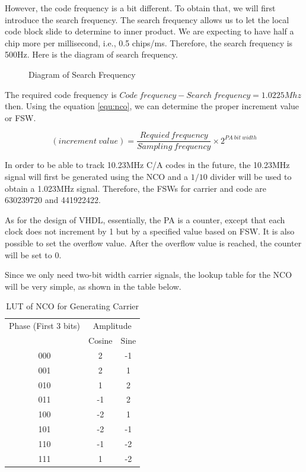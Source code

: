 However, the code frequency is a bit different. To obtain that, we will first introduce the search frequency. The search frequency allows us to let the local code block slide to determine to inner product. We are expecting to have half a chip more per millisecond, i.e., 0.5 chips/ms. Therefore, the search frequency is 500Hz. Here is the diagram of search frequency.

\begin{figure}[!htbp]
    \centering
    
    \caption{Diagram of Search Frequency}
    \label{fig:search_frequency}
\end{figure}

The required code frequency is $Code\  frequency-Search\ frequency = 1.0225Mhz$ then. Using the equation \ref{equ:nco}, we can determine the proper increment value or FSW.

\begin{equation}
    (increment\ value) = \frac{Requied\ frequency}{Sampling\ frequency} \times 2^{PA\ bit\ width}
\end{equation}

In order to be able to track 10.23MHz C/A codes in the future, the 10.23MHz signal will first be generated using the NCO and a $1/10$ divider will be used to obtain a 1.023MHz signal. Therefore, the FSWs for carrier and code are \num{630239720} and \num{441922422}.

As for the design of VHDL, essentially, the PA is a counter, except that each clock does not increment by 1 but by a specified value based on FSW. It is also possible to set the overflow value. After the overflow value is reached, the counter will be set to 0.

Since we only need two-bit width carrier signals, the lookup table for the NCO will be very simple, as shown in the table below.

\begin{table}[!htbp]
\centering
\renewcommand\arraystretch{1.5}
\caption{LUT of NCO for Generating Carrier}
\label{tab:lut_nco}
\begin{tabular}{ccc}
    \toprule
    Phase (First 3 bits) & \multicolumn{2}{c}{Amplitude} \\
    & Cosine & Sine \\
    \midrule
    000 & 2 & -1 \\
    001 & 2 & 1 \\
    010 & 1 & 2 \\
    011 & -1 & 2 \\
    100 & -2 & 1 \\
    101 & -2 & -1 \\
    110 & -1 & -2 \\
    111 & 1 & -2 \\
    \bottomrule
\end{tabular}
\end{table}

